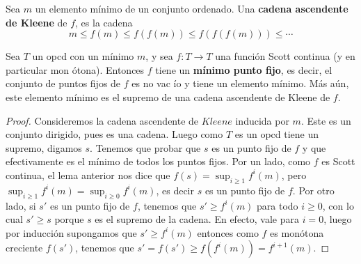 \documentclass[../main.tex]{subfiles}
\begin{document}
  \begin{definition}
  Sea $m$ un elemento mínimo de un conjunto ordenado. Una \textbf{cadena ascendente de
      Kleene} de $f$, es la cadena
      \[
          m \leq f(m) \leq f(f(m)) \leq f(f(f(m))) \leq \cdots
      \]
  \end{definition}

  \begin{theorem}
  Sea $T$ un opcd con un mínimo $m$, y sea $f: T \rightarrow T$ una función Scott continua (y en particular mon
  ótona).
   Entonces $f$ tiene un \textbf{mínimo punto fijo}, es decir, el conjunto de puntos fijos de $f$ es no vac
   ío y tiene un elemento mínimo. Más aún, este elemento mínimo es el supremo de una cadena ascendente de
   Kleene de $f$.
  \end{theorem}
  \begin{proof}
    Consideremos la cadena ascendente de $Kleene$ inducida por $m$. Este es un conjunto dirigido, pues es una
     cadena. Luego como $T$ es un opcd tiene un supremo, digamos $s$. Tenemos que probar que $s$ es un punto
     fijo de $f$ y que efectivamente es el mínimo de todos los puntos fijos. Por un lado, como $f$ es Scott
     continua, el lema anterior nos dice que $f(s) = \sup_{i \geq 1} {f^i(m)}$, pero $\sup_{i \geq 1} {f^i(m)} = \sup_{i \geq 0} {f^i(m)}$, es decir $s$ es un punto fijo de $f$. Por otro lado, si $s'$ es un punto fijo de $f$, tenemos que $s' \geq f^i(m)$ para todo $i\geq 0$, con lo cual $s' \geq s$ porque $s$ es el supremo de la cadena. En efecto, vale para $i= 0$, luego por inducción supongamos que $s' \geq f^{i} (m)$ entonces como $f$ es monótona creciente $f(s')$, tenemos que $s' = f(s') \geq f(f^i(m)) = f^{i+1} (m)$.
  \end{proof}
\end{document}
